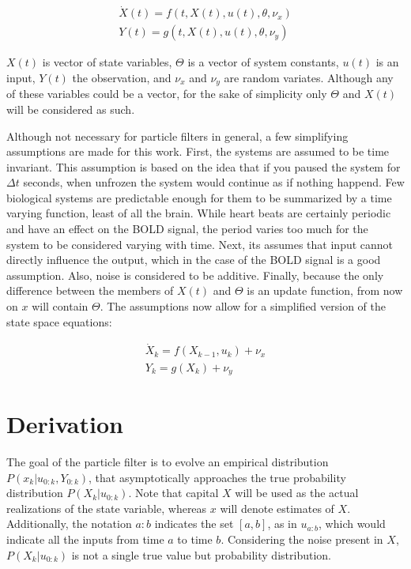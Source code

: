 \begin{eqnarray}
\dot{X}(t) = f(t, X(t), u(t), \theta, \nu_x) \nonumber \\
Y(t) = g(t, X(t), u(t), \theta, \nu_y)
\label{eq:GenericNonlinear}
\end{eqnarray}

$X(t)$ is vector of state variables, $\Theta$ is a vector of system
constants, $u(t)$ is an input, $Y(t)$ the observation, and
$\nu_x$ and $\nu_y$ are random variates. Although any of these
variables could be a vector, for the sake of simplicity only
$\Theta$ and $X(t)$ will be considered as such. 

Although not necessary for particle filters in general, a few  simplifying
assumptions are made for this work. First, the systems are assumed to be 
time invariant. This 
assumption is based on the idea that if you paused the system for $\Delta t$
seconds, when unfrozen the system would continue as if nothing happend. 
Few biological systems are predictable enough for them to be summarized
by a time varying function, least of all the brain. While heart beats are certainly
periodic and have an effect on the BOLD signal, the period varies too much
for the system to be considered varying with time. 
Next, its assumes that input cannot directly
influence the output, which in the case of the BOLD signal is a good assumption.
Also, noise is considered to be additive.
Finally, because the only difference between the members of $X(t)$ and 
$\Theta$ is an update function, from now on $x$ will contain 
$\Theta$. The assumptions now allow for a simplified version of the
state space equations:

\begin{eqnarray}
\dot{X}_k = f(X_{k-1}, u_k) + \nu_x 
\label{eq:stateass}\\
Y_k = g(X_k) + \nu_y 
\label{eq:measass}
\end{eqnarray}

\section{Derivation}
The goal of the particle filter is to evolve an empirical distribution 
$P(x_k | u_{0:k}, Y_{0:k})$,
that asymptotically approaches the true probability distribution $P(X_k | u_{0:k})$.
Note that capital $X$ will be used as the actual realizations of 
the state variable, whereas $x$ will denote estimates of $X$.
Additionally, the notation $a:b$ indicates the set $[a,b]$,
as in $u_{a:b}$, which would indicate all the inputs from time $a$ to time $b$.
Considering the noise present in $X$,
 $P(X_k | u_{0:k})$ is not a single true value but probability distribution. 

